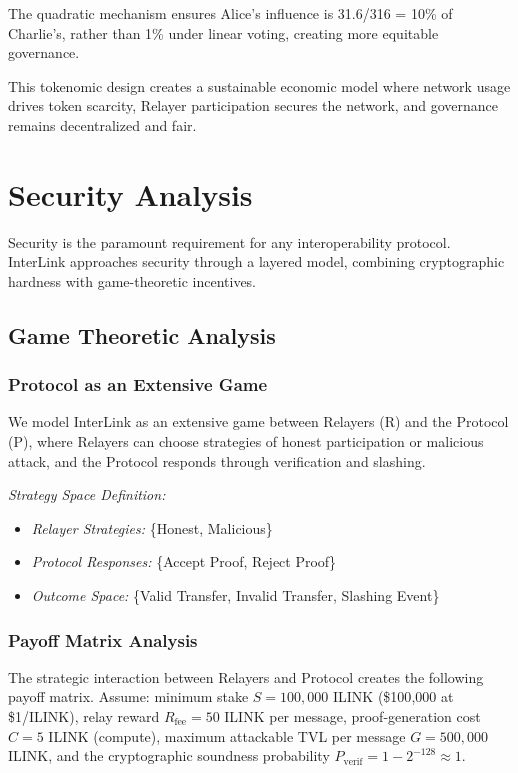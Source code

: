 \documentclass[11pt,a4paper]{article}
\begin{document}
The quadratic mechanism ensures Alice's influence is 31.6/316 = 10\% of Charlie's, rather than 1\% under linear voting, creating more equitable governance.

This tokenomic design creates a sustainable economic model where network usage drives token scarcity, Relayer participation secures the network, and governance remains decentralized and fair.

\section{Security Analysis}
\label{sec:security}

Security is the paramount requirement for any interoperability protocol. InterLink approaches security through a layered model, combining cryptographic hardness with game-theoretic incentives.

\subsection{Game Theoretic Analysis}

\subsubsection{Protocol as an Extensive Game}
We model InterLink as an extensive game between Relayers (R) and the Protocol (P), where Relayers can choose strategies of honest participation or malicious attack, and the Protocol responds through verification and slashing.

\textit{Strategy Space Definition:}
\begin{itemize}
    \item \textit{Relayer Strategies:} \{Honest, Malicious\}
    \item \textit{Protocol Responses:} \{Accept Proof, Reject Proof\}
    \item \textit{Outcome Space:} \{Valid Transfer, Invalid Transfer, Slashing Event\}
\end{itemize}

\subsubsection{Payoff Matrix Analysis}
The strategic interaction between Relayers and Protocol creates the following payoff matrix.
Assume: minimum stake $S = 100{,}000$ ILINK (\$100{,}000 at \$1/ILINK), relay reward
$R_{\text{fee}} = 50$ ILINK per message, proof-generation cost $C = 5$ ILINK (compute),
maximum attackable TVL per message $G = 500{,}000$ ILINK, and the cryptographic
soundness probability $P_{\text{verif}} = 1 - 2^{-128} \approx 1$.
\end{document}
